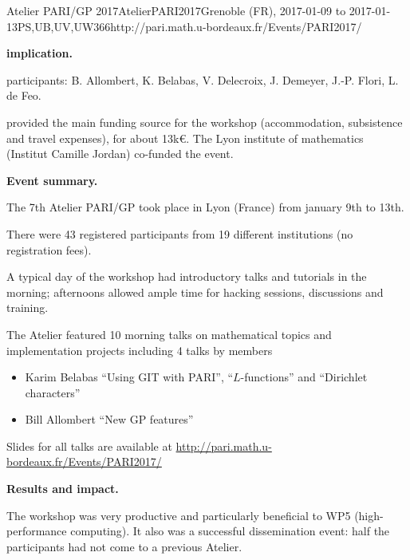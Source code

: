 \begin{event}{Atelier PARI/GP 2017}{AtelierPARI2017}{Grenoble (FR),
2017-01-09 to 2017-01-13}{PS,UB,UV,UW}{36}{6}{http://pari.math.u-bordeaux.fr/Events/PARI2017/}


\textbf{\ODK implication.}

\ODK participants: B. Allombert, K. Belabas, V. Delecroix, J. Demeyer,
J.-P. Flori, L. de Feo.

\ODK provided the main funding source for the workshop (accommodation,
subsistence and travel expenses), for about 13k\euro. The Lyon
institute of mathematics (Institut Camille Jordan) co-funded the event.

\textbf{Event summary.}

The 7th Atelier PARI/GP took place in Lyon (France) from january
9th to 13th.

There were 43 registered participants from 19 different institutions
(no registration fees).

A typical day of the workshop had introductory talks and tutorials
in the morning; afternoons allowed ample time for hacking sessions,
discussions and training.

The Atelier featured 10 morning talks on mathematical topics and
implementation projects including 4 talks by \ODK members
\begin{itemize}
\item Karim Belabas ``Using GIT with PARI'', ``$L$-functions'' and
  ``Dirichlet characters''
\item Bill Allombert ``New GP features''
\end{itemize}

Slides for all talks are available at
\url{http://pari.math.u-bordeaux.fr/Events/PARI2017/}

\textbf{Results and impact.}

The workshop was very productive and particularly beneficial to WP5
(high-performance computing). It also was a successful dissemination event: half
  the participants had not come to a previous Atelier.

\end{event}
